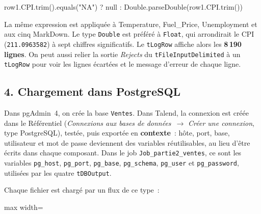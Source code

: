 \begin{code}[title=\textbf{Expression de la colonne CPI} (sortie Double nullable)]
row1.CPI.trim().equals("NA") ? null : Double.parseDouble(row1.CPI.trim())
\end{code}

\noindent La même expression est appliquée à Temperature, Fuel\_Price, Unemployment et aux cinq MarkDown. Le type \texttt{Double} est préféré à \texttt{Float}, qui arrondirait le CPI (\texttt{211.0963582}) à sept chiffres significatifs. Le \texttt{tLogRow} affiche alors les \textbf{8\,190 lignes}. On peut aussi relier la sortie \textit{Rejects} du \texttt{tFileInputDelimited} à un \texttt{tLogRow} pour voir les lignes écartées et le message d'erreur de chaque ligne.

\subsection*{4. Chargement dans PostgreSQL}
{}

\noindent Dans pgAdmin~4, on crée la base \texttt{Ventes}. Dans Talend, la connexion est créée dans le Référentiel (\textit{Connexions aux bases de données}~$\rightarrow$ \textit{Créer une connexion}, type PostgreSQL), testée, puis exportée en \textbf{contexte}~: hôte, port, base, utilisateur et mot de passe deviennent des variables réutilisables, au lieu d'être écrits dans chaque composant. Dans le job \texttt{Job\_partie2\_ventes}, ce sont les variables \texttt{pg\_host}, \texttt{pg\_port}, \texttt{pg\_base}, \texttt{pg\_schema}, \texttt{pg\_user} et \texttt{pg\_password}, utilisées par les quatre \texttt{tDBOutput}.

\noindent Chaque fichier est chargé par un flux de ce type~:

\begin{center}
\begin{adjustbox}{max width=\linewidth}
\end{adjustbox}
\end{center}

